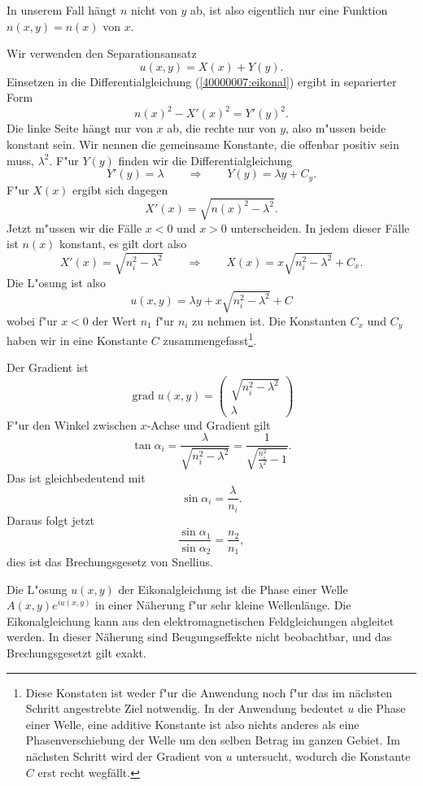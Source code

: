 \begin{loesung}
In unserem Fall hängt $n$ nicht von $y$ ab, ist also eigentlich
nur eine Funktion $n(x,y)=n(x)$ von $x$.
\begin{teilaufgaben}
\item
Wir verwenden den Separationsansatz
\[
u(x,y)=X(x) + Y(y).
\]
Einsetzen in die Differentialgleichung
(\ref{40000007:eikonal}) ergibt in separierter Form
\[
n(x)^2-X'(x)^2=Y'(y)^2.
\]
Die linke Seite hängt nur von $x$ ab, die rechte nur von $y$,
also m"ussen beide konstant sein.
Wir nennen die gemeinsame Konstante, die offenbar positiv sein
muss, $\lambda^2$.
F"ur $Y(y)$ finden wir die Differentialgleichung
\[
Y'(y)=\lambda \qquad\Rightarrow\qquad Y(y)=\lambda y+ C_y.
\]
F"ur $X(x)$ ergibt sich dagegen
\[
X'(x)=\sqrt{n(x)^2-\lambda^2}.
\]
Jetzt m"ussen wir die Fälle $x<0$ und $x>0$ unterscheiden.
In jedem dieser Fälle ist $n(x)$ konstant, es gilt dort
also
\[
X'(x)=\sqrt{n_i^2-\lambda^2}
\qquad
\Rightarrow
\qquad
X(x)=x\sqrt{n_i^2-\lambda^2} + C_x.
\]
Die L"osung ist also
\[
u(x,y)=\lambda y + x\sqrt{n_i^2-\lambda^2} + C
\]
wobei f"ur $x<0$ der Wert $n_1$ f"ur $n_i$ zu nehmen ist.
Die Konstanten $C_x$ und $C_y$ haben wir in eine Konstante $C$
zusammengefasst\footnote{Diese Konstaten ist weder f"ur die Anwendung noch
f"ur das im nächsten Schritt angestrebte Ziel notwendig. In der Anwendung
bedeutet $u$ die Phase einer Welle, eine additive Konstante ist also nichts
anderes als eine Phasenverschiebung der Welle um den selben Betrag
im ganzen Gebiet. Im nächsten Schritt wird der Gradient von $u$ untersucht,
wodurch die Konstante $C$ erst recht wegfällt.}.
\item
Der Gradient ist
\[
\operatorname{grad}u(x,y)
=
\begin{pmatrix}
\sqrt{n_i^2-\lambda^2}\\
\lambda
\end{pmatrix}
\]
F"ur den Winkel zwischen $x$-Achse und Gradient gilt
\[
\tan\alpha_i
=
\frac{\lambda}{\sqrt{n_i^2-\lambda^2}}
=
\frac1{\sqrt{\frac{n_i^2}{\lambda^2}-1}}.
\]
Das ist gleichbedeutend mit
\[
\sin\alpha_i=\frac{\lambda}{n_i}.
\]
Daraus folgt jetzt
\[
\frac{ \sin\alpha_1}{\sin\alpha_2}=\frac{n_2}{n_1},
\]
dies ist das Brechungsgesetz von Snellius.
\qedhere
\end{teilaufgaben}
\end{loesung}

\begin{diskussion}
Die L"osung $u(x,y)$ der Eikonalgleichung ist die Phase einer Welle
$A(x,y)e^{iu(x,y)}$ in einer Näherung f"ur sehr kleine Wellenlänge.
Die Eikonalgleichung kann aus den elektromagnetischen Feldgleichungen
abgleitet werden.
In dieser Näherung sind Beugungseffekte nicht beobachtbar, und das
Brechungsgesetzt gilt exakt.
\end{diskussion}
